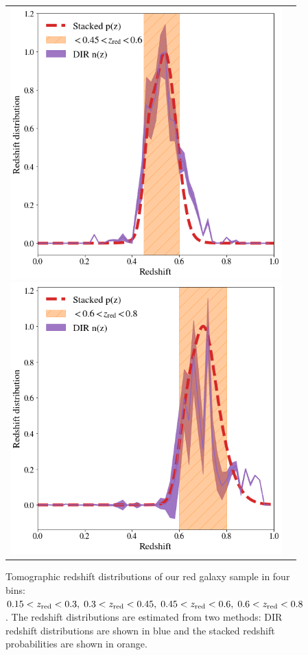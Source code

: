 \documentclass[fleqn,usenatbib,useAMS]{mnras}
\begin{document}
\begin{figure}
\begin{tabular}{cc}
\end{tabular}
\begin{tabular}{cc}
\includegraphics[width=\columnwidth]{figures_tmp/nz_comp_3.png}
\includegraphics[width=\columnwidth]{figures_tmp/nz_comp_4.png}
\end{tabular}

\caption{\label{fig:pz2} Tomographic redshift distributions of our red galaxy sample in four bins: $0.15<z_{\rm red}<0.3, \;0.3<z_{\rm red}<0.45, \;0.45<z_{\rm red}<0.6, \;0.6<z_{\rm red}<0.8$.
 The redshift distributions are estimated from two methods: DIR redshift distributions are shown in blue and the stacked redshift probabilities are shown in orange.} 
\end{figure}
\end{document}
